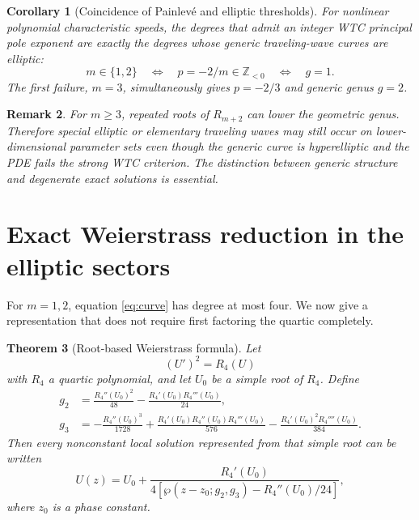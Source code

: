 \documentclass[11pt]{article}
\newtheorem{theorem}{Theorem}[section]
\newtheorem{corollary}[theorem]{Corollary}
\newtheorem{remark}[theorem]{Remark}
\newcommand{\wpF}{\wp}
\begin{document}
\begin{corollary}[Coincidence of Painlev\'e and elliptic thresholds]
For nonlinear polynomial characteristic speeds, the degrees that admit an integer WTC principal pole exponent are exactly the degrees whose generic traveling-wave curves are elliptic:
\[
 m\in\{1,2\}
 \quad\Longleftrightarrow\quad
 p=-2/m\in\mathbb Z_{<0}
 \quad\Longleftrightarrow\quad
 g=1.
\]
The first failure, $m=3$, simultaneously gives $p=-2/3$ and generic genus $g=2$.
\end{corollary}

\begin{remark}
For $m\ge3$, repeated roots of $R_{m+2}$ can lower the geometric genus.  Therefore special elliptic or elementary traveling waves may still occur on lower-dimensional parameter sets even though the generic curve is hyperelliptic and the PDE fails the strong WTC criterion.  The distinction between generic structure and degenerate exact solutions is essential.
\end{remark}

\section{Exact Weierstrass reduction in the elliptic sectors}
For $m=1,2$, equation \eqref{eq:curve} has degree at most four.  We now give a representation that does not require first factoring the quartic completely.

\begin{theorem}[Root-based Weierstrass formula]
Let
\begin{equation}
 (U')^2=R_4(U)
 \label{eq:quartic}
\end{equation}
with $R_4$ a quartic polynomial, and let $U_0$ be a simple root of $R_4$.  Define
\begin{align}
 g_2&=\frac{R_4''(U_0)^2}{48}
      -\frac{R_4'(U_0)R_4'''(U_0)}{24},
 \label{eq:g2}\\
 g_3&=-\frac{R_4''(U_0)^3}{1728}
      +\frac{R_4'(U_0)R_4''(U_0)R_4'''(U_0)}{576}
      -\frac{R_4'(U_0)^2R_4''''(U_0)}{384}.
 \label{eq:g3}
\end{align}
Then every nonconstant local solution represented from that simple root can be written
\begin{equation}
 U(z)=U_0+
 \frac{R_4'(U_0)}{4\left[\wpF(z-z_0;g_2,g_3)-R_4''(U_0)/24\right]},
 \label{eq:weier}
\end{equation}
where $z_0$ is a phase constant.
\end{theorem}
\end{document}

